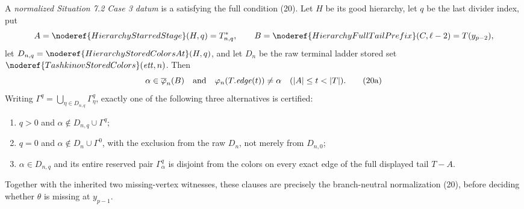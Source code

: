 \begin{definition}
A \emph{normalized Situation 7.2 Case 3 datum} is a
 satisfying the full condition
(20).  Let \(H\) be its good hierarchy, let \(q\) be the last divider index,
put
\[
 A=\noderef{HierarchyStarredStage}(H,q)=T_{n,q}^{*},\qquad
 B=\noderef{HierarchyFullTailPrefix}(C,\ell-2)=T(y_{p-2}),
\]
let \(D_{n,q}=\noderef{HierarchyStoredColorsAt}(H,q)\), and let \(D_n\)
be the raw terminal ladder stored set
\(\noderef{TashkinovStoredColors}(\mathit{ett},n)\).  Then
\[
 \alpha\in\overline\varphi_n(B)
 \quad\hbox{and}\quad
 \varphi_n(T.\mathit{edge}(t))\ne\alpha
       \quad(|A|\leq t<|T|).                                  \tag{20a}
\]
Writing
\(\Gamma^q=\bigcup_{\eta\in D_{n,q}}\Gamma^q_\eta\), exactly one of the
following three alternatives is certified:
\begin{enumerate}
\item \(q>0\) and
      \(\alpha\notin D_{n,q}\cup\Gamma^q\);
\item \(q=0\) and
      \(\alpha\notin D_n\cup\Gamma^0\), with the exclusion from the raw
      \(D_n\), not merely from \(D_{n,0}\);
\item \(\alpha\in D_{n,q}\) and its entire reserved pair
      \(\Gamma^q_\alpha\) is disjoint from the colors on every exact edge
      of the full displayed tail \(T-A\).
\end{enumerate}
Together with the inherited two missing-vertex witnesses, these clauses are
precisely the branch-neutral normalization (20), before deciding whether
\(\theta\) is missing at \(y_{p-1}\).
\end{definition}
